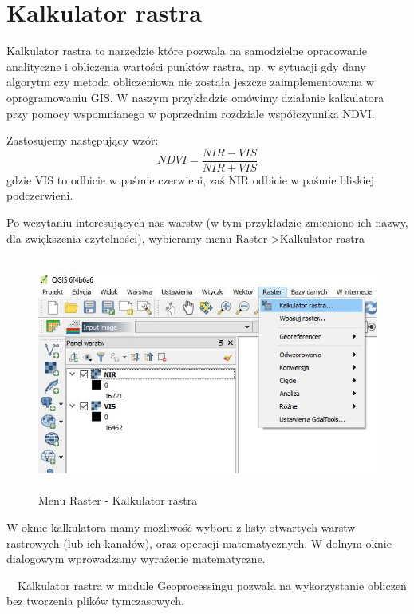\documentclass[12pt,a4paper]{book}
\begin{document}
\section[Kalkulator rastra]{Kalkulator rastra}
Kalkulator rastra to narzędzie które pozwala na samodzielne opracowanie analityczne i obliczenia wartości punktów rastra, np. w sytuacji gdy dany algorytm czy metoda obliczeniowa nie została jeszcze zaimplementowana w oprogramowaniu GIS. W naszym przykładzie omówimy działanie kalkulatora przy pomocy wspomnianego w poprzednim rozdziale współczynnika NDVI.

Zastosujemy następujący wzór:
\begin{equation}
NDVI = \frac{NIR-VIS}{NIR+VIS}
\end{equation}
gdzie VIS to odbicie w paśmie czerwieni, zaś NIR odbicie w paśmie bliskiej podczerwieni.

Po wczytaniu interesujących nas warstw (w tym przykładzie zmieniono ich nazwy, dla zwiększenia czytelności), wybieramy menu  Raster-{\textgreater}Kalkulator rastra 


\begin{center}
\begin{figure}
\includegraphics[width=13cm,height=7.691cm]{004-kalkulator.jpg}
\caption{Menu Raster - Kalkulator rastra}
\end{figure}
\end{center}
W oknie kalkulatora mamy możliwość wyboru z listy otwartych warstw rastrowych (lub ich kanałów), oraz operacji matematycznych. W dolnym oknie dialogowym wprowadzamy wyrażenie matematyczne.

\ \ Kalkulator rastra w module Geoprocessingu pozwala na wykorzystanie obliczeń bez tworzenia plików tymczasowych.
\end{document}
